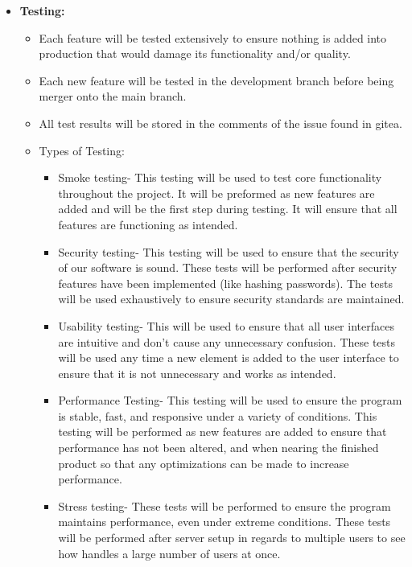 \documentclass[letterpaper,12pt,oneside,listof=totoc]{scrreprt}
\begin{document}
\begin{itemize}
\begin{itemize}
\begin{itemize}
\begin{itemize}
            \end{itemize}
        \end{itemize}
    \end{itemize}
    \item \textbf{Testing:}
    \begin{itemize}
        \item Each feature will be tested extensively to ensure nothing is added into production that would damage its functionality and/or quality. 
        \item Each new feature will be tested in the development branch before being merger onto the main branch. 
        \item All test results will be stored in the comments of the issue found in gitea.
        \item Types of Testing:
        \begin{itemize}
            \item Smoke testing- This testing will be used to test core functionality throughout the project. It will be preformed as new features are added and will be the first step during testing. It will ensure that all features are functioning as intended.
            \item Security testing- This testing will be used to ensure that the security of our software is sound. These tests will be performed after security features have been implemented (like hashing passwords). The tests will be used exhaustively to ensure security standards are maintained. 
            \item Usability testing- This will be used to ensure that all user interfaces are intuitive and don't cause any unnecessary confusion. These tests will be used any time a new element is added to the user interface to ensure that it is not unnecessary and works as intended. 
            \item Performance Testing- This testing will be used to ensure the program is stable, fast, and responsive under a variety of conditions. This testing will be performed as new features are added to ensure that performance has not been altered, and when nearing the finished product so that any optimizations can be made to increase performance. 
            \item Stress testing- These tests will be performed to ensure the program maintains performance, even under extreme conditions. These tests will be performed after server setup in regards to multiple users to see how handles a large number of users at once. 

\end{itemize}
\end{itemize}
\end{itemize}
\end{document}
